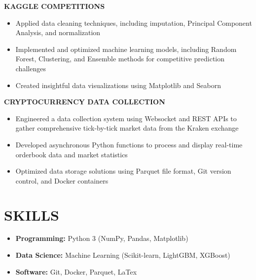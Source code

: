 \documentclass[10pt,letterpaper]{article}
\begin{document}
\begin{flushleft}
\textbf{\color{subheadingcolor}KAGGLE COMPETITIONS}
\begin{itemize}[leftmargin=*,nosep,itemsep=2pt]
    \item Applied data cleaning techniques, including imputation, Principal Component Analysis, and normalization
    \item Implemented and optimized machine learning models, including Random Forest, Clustering, and Ensemble methods for competitive prediction challenges
    \item Created insightful data visualizations using Matplotlib and Seaborn
\end{itemize}
\end{flushleft}

\begin{flushleft}
\textbf{\color{subheadingcolor}CRYPTOCURRENCY DATA COLLECTION}
\begin{itemize}[leftmargin=*,nosep,itemsep=2pt]
    \item Engineered a data collection system using Websocket and REST APIs to gather comprehensive tick-by-tick market data from the Kraken exchange
    \item Developed asynchronous Python functions to process and display real-time orderbook data and market statistics
    \item Optimized data storage solutions using Parquet file format, Git version control, and Docker containers
\end{itemize}
\end{flushleft}

\vspace{0.5em}
\section{SKILLS}
\vspace{0.5em}
\begin{itemize}[leftmargin=*,nosep,itemsep=2pt]
  \item \textbf{Programming:} Python 3 (NumPy, Pandas, Matplotlib)
  \item \textbf{Data Science:} Machine Learning (Scikit-learn, LightGBM, XGBoost)
  \item \textbf{Software:} Git, Docker, Parquet, LaTex
\end{itemize}


\vspace{0.5em}
\end{document}
